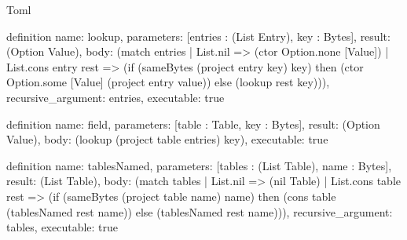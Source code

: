 \begin{lexlean}{Toml}
\begin{semanticmodule}
definition{
  name: lookup,
  parameters: [entries : (List Entry), key : Bytes],
  result: (Option Value),
  body: (match entries
    | List.nil => (ctor Option.none [Value])
    | List.cons entry rest => (if (sameBytes (project entry key) key) then (ctor Option.some [Value] (project entry value)) else (lookup rest key))),
  recursive_argument: entries,
  executable: true
}

definition{
  name: field,
  parameters: [table : Table, key : Bytes],
  result: (Option Value),
  body: (lookup (project table entries) key),
  executable: true
}

definition{
  name: tablesNamed,
  parameters: [tables : (List Table), name : Bytes],
  result: (List Table),
  body: (match tables
    | List.nil => (nil Table)
    | List.cons table rest => (if (sameBytes (project table name) name) then (cons table (tablesNamed rest name)) else (tablesNamed rest name))),
  recursive_argument: tables,
  executable: true
}
\end{semanticmodule}
\end{lexlean}
